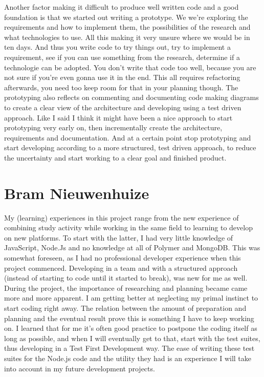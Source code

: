 Another factor making it difficult to produce well written code
and a good foundation
is that we started out writing a prototype.
We we're exploring the requirements and how to implement them,
the possibilities of the research
and what technologies to use.
All this making it very unsure where we would be in ten days.
And thus you write code to try things out,
try to implement a requirement,
see if you can use something from the research,
determine if a technologie can be adopted.
You don't write that code too well,
because you are not sure if you're even gonna use it in the end.
This all requires refactoring afterwards,
you need too keep room for that in your planning though.
The prototyping also reflects on commenting and documenting code
making diagrams to create a clear view of the architecture
and developing using a test driven approach.
Like I said I think it might have been a nice approach
to start prototyping very early on,
then incrementally create the architecture, requirements and documentation.
And at a certain point stop prototyping
and start developing according to a more structured, test driven approach,
to reduce the uncertainty
and start working to a clear goal and finished product.

\section{Bram Nieuwenhuize}
My (learning) experiences in this project range from the new experience of 
combining study activity while working in the same field to learning to develop 
on new platforms.
To start with the latter, I had very little knowledge of 
JavaScript, Node.Js and no knowledge at all of Polymer and 
MongoDB. This was somewhat foreseen, as I had no 
professional developer experience when this project 
commenced. Developing in a team and with a
structured approach (instead of starting to code until it started to break),
was new for me as well. During the project, the importance of 
researching and planning became came more and more apparent. I am getting better
at neglecting my primal instinct to start coding right away. The relation 
between the amount of preparation and planning and the eventual result prove 
this is something I have to keep working on. I learned that for me it's often
good practice to postpone the coding itself as long as possible, and when I will
eventually get to that, start with the test suites, thus developing in a Test 
First Development way. The ease of writing these test suites for the Node.js
code and the utility they had is an experience I will take into account in my
future development projects.

